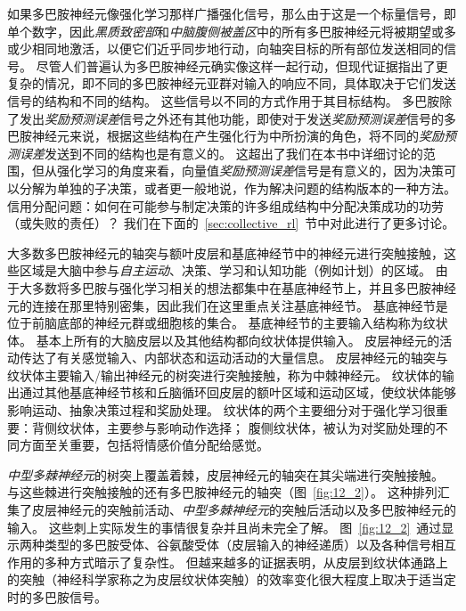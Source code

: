 如果多巴胺神经元像强化学习那样广播强化信号，那么由于这是一个标量信号，即单个数字，因此\textit{黑质致密部}和\textit{中脑腹侧被盖区}中的所有多巴胺神经元将被期望或多或少相同地激活，以便它们近乎同步地行动，向轴突目标的所有部位发送相同的信号。 
尽管人们普遍认为多巴胺神经元确实像这样一起行动，但现代证据指出了更复杂的情况，即不同的多巴胺神经元亚群对输入的响应不同，具体取决于它们发送信号的结构和不同的结构。
这些信号以不同的方式作用于其目标结构。
多巴胺除了发出\textit{奖励预测误差}信号之外还有其他功能，即使对于发送\textit{奖励预测误差}信号的多巴胺神经元来说，根据这些结构在产生强化行为中所扮演的角色，将不同的\textit{奖励预测误差}发送到不同的结构也是有意义的。
这超出了我们在本书中详细讨论的范围，但从强化学习的角度来看，向量值\textit{奖励预测误差}信号是有意义的，因为决策可以分解为单独的子决策，或者更一般地说，作为解决问题的结构版本的一种方法。
信用分配问题：如何在可能参与制定决策的许多组成结构中分配决策成功的功劳（或失败的责任）？
我们在下面的~\ref{sec:collective_rl}~节中对此进行了更多讨论。


大多数多巴胺神经元的轴突与额叶皮层和基底神经节中的神经元进行突触接触，这些区域是大脑中参与\textit{自主运动}、决策、学习和认知功能（例如计划）的区域。
由于大多数将多巴胺与强化学习相关的想法都集中在基底神经节上，并且多巴胺神经元的连接在那里特别密集，因此我们在这里重点关注基底神经节。
基底神经节是位于前脑底部的神经元群或细胞核的集合。 基底神经节的主要输入结构称为纹状体。
基本上所有的大脑皮层以及其他结构都向纹状体提供输入。
皮层神经元的活动传达了有关感觉输入、内部状态和运动活动的大量信息。
皮层神经元的轴突与纹状体主要输入/输出神经元的树突进行突触接触，称为中棘神经元。
纹状体的输出通过其他基底神经节核和丘脑循环回皮层的额叶区域和运动区域，使纹状体能够影响运动、抽象决策过程和奖励处理。
纹状体的两个主要细分对于强化学习很重要：背侧纹状体，主要参与影响动作选择；
腹侧纹状体，被认为对奖励处理的不同方面至关重要，包括将情感价值分配给感觉。



\textit{中型多棘神经元}的树突上覆盖着棘，皮层神经元的轴突在其尖端进行突触接触。
与这些棘进行突触接触的还有多巴胺神经元的轴突（图~\ref{fig:12_2}）。
这种排列汇集了皮层神经元的突触前活动、\textit{中型多棘神经元}的突触后活动以及多巴胺神经元的输入。
这些刺上实际发生的事情很复杂并且尚未完全了解。
图~\ref{fig:12_2}~通过显示两种类型的多巴胺受体、谷氨酸受体（皮层输入的神经递质）以及各种信号相互作用的多种方式暗示了复杂性。
但越来越多的证据表明，从皮层到纹状体通路上的突触（神经科学家称之为皮层纹状体突触）的效率变化很大程度上取决于适当定时的多巴胺信号。



